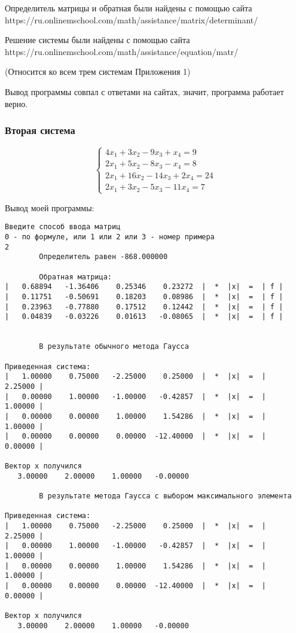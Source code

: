 \documentclass[a4paper,12pt,titlepage,finall]{article}
\begin{document}
Определитель матрицы и обратная были найдены с помощью сайта
\\https://ru.onlinemschool.com/math/assistance/matrix/determinant/

Решение системы были найдены с помощью сайта
\\https://ru.onlinemschool.com/math/assistance/equation/matr/

(Относится ко всем трем системам Приложения 1)

Вывод программы совпал с ответами на сайтах, значит, программа работает верно.

\subsubsection{Вторая система}

\begin{equation*}
 \begin{cases}
   4x_1 + 3x_2 - 9x_3 + x_4 = 9
   \\
   2x_1 + 5x_2 - 8x_3 - x_4 = 8
   \\
   2x_1 + 16x_2 - 14x_3 + 2x_4 = 24
   \\
   2x_1 + 3x_2 - 5x_3  - 11x_4 = 7
 \end{cases}
\end{equation*}


Вывод моей программы:

\begin{verbatim}
Введите способ ввода матриц
0 - по формуле, или 1 или 2 или 3 - номер примера
2
        Определитель равен -868.000000

        Обратная матрица:
|   0.68894   -1.36406    0.25346    0.23272  |  *  |x|  =  | f |
|   0.11751   -0.50691    0.18203    0.08986  |  *  |x|  =  | f |
|   0.23963   -0.77880    0.17512    0.12442  |  *  |x|  =  | f |
|   0.04839   -0.03226    0.01613   -0.08065  |  *  |x|  =  | f |


        В результате обычного метода Гаусса

Приведенная система:
|   1.00000    0.75000   -2.25000    0.25000  |  *  |x|  =  |   2.25000 |
|   0.00000    1.00000   -1.00000   -0.42857  |  *  |x|  =  |   1.00000 |
|   0.00000    0.00000    1.00000    1.54286  |  *  |x|  =  |   1.00000 |
|   0.00000    0.00000    0.00000  -12.40000  |  *  |x|  =  |   0.00000 |

Вектор х получился
   3.00000    2.00000    1.00000   -0.00000 

        В результате метода Гаусса с выбором максимального элемента

Приведенная система:
|   1.00000    0.75000   -2.25000    0.25000  |  *  |x|  =  |   2.25000 |
|   0.00000    1.00000   -1.00000   -0.42857  |  *  |x|  =  |   1.00000 |
|   0.00000    0.00000    1.00000    1.54286  |  *  |x|  =  |   1.00000 |
|   0.00000    0.00000    0.00000  -12.40000  |  *  |x|  =  |   0.00000 |

Вектор х получился
   3.00000    2.00000    1.00000   -0.00000 


\end{verbatim}
\end{document}
